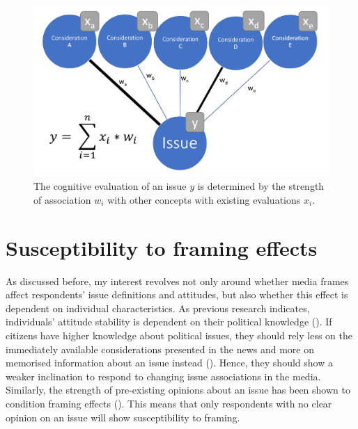 \documentclass{article}
\begin{document}
\begin{center}
\begin{figure}
    \centering
    \includegraphics[width=\textwidth]{CognitiveStorage.png}
    \caption{The cognitive evaluation of an issue $y$ is determined by the strength of association $w_i$ with other concepts with existing evaluations $x_i$.}
    \label{fig:cogStor}
\end{figure}
\end{center}



\section{Susceptibility to framing effects}

As discussed before, my interest revolves not only around whether media frames affect respondents' issue definitions and attitudes, but also whether this effect is dependent on individual characteristics. As previous research indicates, individuals' attitude stability is dependent on their political knowledge (\cite{Converse1962}). If citizens have higher knowledge about political issues, they should rely less on the immediately available considerations presented in the news and more on memorised information about an issue instead (\cite{Zaller1992}). Hence, they should show a weaker inclination to respond to changing issue associations in the media. Similarly, the strength of pre-existing opinions about an issue has been shown to condition framing effects (\cite{Bechtel2015, Chong2013}). This means that only respondents with no clear opinion on an issue will show susceptibility to framing. 
\end{document}
